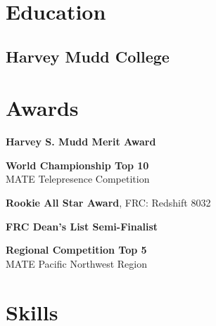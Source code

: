 \documentclass[]{deedy-long-resume}
\begin{document}
\begin{paracol}{2}


\section{Education} 

\subsection{Harvey Mudd College\hfill}
\sectionsep


\section{Awards} 
\begin{description}[style=multiline,nosep,leftmargin=1cm,font=\normalfont]
\item[2022] \textbf{Harvey S. Mudd Merit Award}
\item[2021] \textbf{World Championship Top 10} \\ MATE  Telepresence Competition
\item[2020] \textbf{Rookie All Star Award}, FRC: Redshift 8032
\item[2020] \textbf{FRC Dean's List Semi-Finalist}
\item[2018] \textbf{Regional Competition Top 5} \\ MATE Pacific Northwest Region 
\end{description}

\sectionsep


\section{Skills}

\end{paracol}
\end{document}
